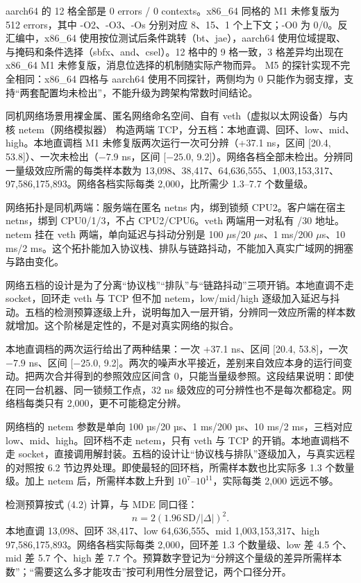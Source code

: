 aarch64 的 12 格全部是 0 errors / 0 contexts。x86\_64 同格的 M1 未修复版为 512 errors，其中 -O2、-O3、-Os 分别对应 8、15、1 个上下文；-O0 为 0/0。反汇编中，x86\_64 使用按位测试后条件跳转（bt、jae），aarch64 使用位域提取、与掩码和条件选择（sbfx、and、csel）。12 格中的 9 格一致，3 格差异均出现在 x86\_64 M1 未修复版，消息位选择的机制随实际产物而异。
M5 的探针实现不完全相同：x86\_64 四格与 aarch64 使用不同探针，两侧均为 0 只能作为弱支撑，支持“两套配置均未检出”，不能升级为跨架构常数时间结论。

同机网络场景用裸金属、匿名网络命名空间、自有 veth（虚拟以太网设备）与内核 netem（网络模拟器） 构造两端 TCP，分五档：本地直调、回环、low、mid、high。本地直调档 M1 未修复版两次运行一次可分辨（+37.1 ns，区间 [20.4, 53.8]）、一次未检出（$-7.9$ ns，区间 [$-25.0$, 9.2]）。网络各档全部未检出。分辨同一量级效应所需的每类样本数为 13,098、38,417、64,636,555、1,003,153,317、97,586,175,893。网络各档实际每类 2,000，比所需少 1.3--7.7 个数量级。%

网络拓扑是同机两端：服务端在匿名 netns 内，绑到锁频 CPU2。客户端在宿主 netns，绑到 CPU0/1/3，不占 CPU2/CPU6。veth 两端用一对私有 /30 地址。netem 挂在 veth 两端，单向延迟与抖动分别是 100 $\mu$s/20 $\mu$s、1 ms/200 $\mu$s、10 ms/2 ms。这个拓扑能加入协议栈、排队与链路抖动，不能加入真实广域网的拥塞与路由变化。

网络五档的设计是为了分离“协议栈”“排队”与“链路抖动”三项开销。本地直调不走 socket，回环走 veth 与 TCP 但不加 netem，low/mid/high 逐级加入延迟与抖动。五档的检测预算逐级上升，说明每加入一层开销，分辨同一效应所需的样本数就增加。这个阶梯是定性的，不是对真实网络的拟合。

本地直调档的两次运行给出了两种结果：一次 +37.1 ns、区间 [20.4, 53.8]，一次 $-7.9$ ns、区间 [$-25.0$, 9.2]。两次的噪声水平接近，差别来自效应本身的运行间变动。把两次合并得到的参照效应区间含 0，只能当量级参照。这段结果说明：即使在同一台机器、同一锁频工作点，32 ns 级效应的可分辨性也不是每次都稳定。网络档每类只有 2,000，更不可能稳定分辨。

网络档的 netem 参数是单向 100 µs/20 µs、1 ms/200 µs、10 ms/2 ms，三档对应 low、mid、high。回环档不走 netem，只有 veth 与 TCP 的开销。本地直调档不走 socket，直接调用解封装。五档的设计让“协议栈与排队”逐级加入，与真实远程的对照按 6.2 节边界处理。即使最轻的回环档，所需样本数也比实际多 1.3 个数量级。加上 netem 后，所需样本数上升到 $10^7$--$10^{11}$，实际每类 2,000 远远不够。

检测预算按式 (4.2) 计算，与 MDE 同口径：
\begin{equation}\tag{4.2}
n = 2\left(1.96\,\mathrm{SD}/|\Delta|\right)^2 .
\end{equation}
本地直调 13,098、回环 38,417、low 64,636,555、mid 1,003,153,317、high 97,586,175,893。网络各档实际每类 2,000，回环差 1.3 个数量级、low 差 4.5 个、mid 差 5.7 个、high 差 7.7 个。预算数字登记为“分辨这个量级的差异所需样本数”；“需要这么多才能攻击”按可利用性分层登记，两个口径分开。

